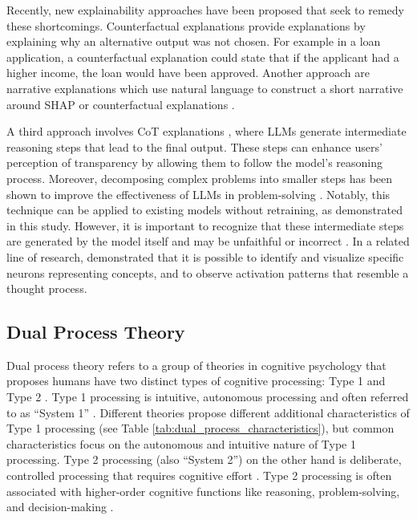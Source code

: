 Recently, new explainability approaches have been proposed that seek to remedy these shortcomings. Counterfactual explanations \parencite{Wachter2017} provide explanations by explaining why an alternative output was not chosen. For example in a loan application, a counterfactual explanation could state that if the applicant had a higher income, the loan would have been approved. Another approach are narrative explanations which use natural language to construct a short narrative around SHAP or counterfactual explanations \parencite{Martens2025}.

A third approach involves \ac{CoT} explanations \parencite{Wei2022}, where \acp{LLM} generate intermediate reasoning steps that lead to the final output. These steps can enhance users' perception of transparency by allowing them to follow the model's reasoning process. Moreover, decomposing complex problems into smaller steps has been shown to improve the effectiveness of \acp{LLM} in problem-solving \parencite{Wei2022}. Notably, this technique can be applied to existing models without retraining, as demonstrated in this study. However, it is important to recognize that these intermediate steps are generated by the model itself and may be unfaithful or incorrect \parencite{Turpin2023, Schneider2024}. In a related line of research, \textcite{Lindsey2025} demonstrated that it is possible to identify and visualize specific neurons representing concepts, and to observe activation patterns that resemble a thought process.

\subsection{Dual Process Theory} \label{ssec:dual_process}

Dual process theory refers to a group of theories in cognitive psychology that proposes humans have two distinct types of cognitive processing: Type 1 and Type 2 \parencite{Evans2013}. Type 1 processing is intuitive, autonomous processing and often referred to as “System 1” \parencite{Kahnemann2011}. Different theories propose different additional characteristics of Type 1 processing (see Table \ref{tab:dual_process_characteristics}), but common characteristics focus on the autonomous and intuitive nature of Type 1 processing. Type 2 processing (also “System 2”) on the other hand is deliberate, controlled processing that requires cognitive effort \parencite{Evans2013}. Type 2 processing is often associated with higher-order cognitive functions like reasoning, problem-solving, and decision-making \parencite{Kahnemann2011}.

